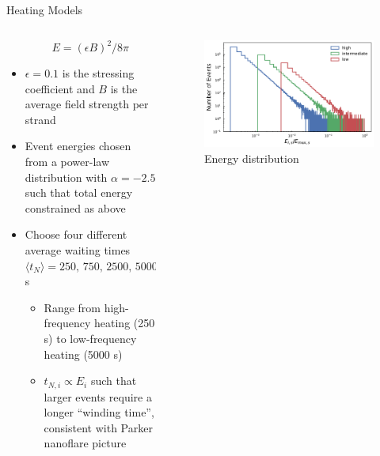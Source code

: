 \documentclass[final]{beamer}
\begin{document}
\begin{frame}
\begin{columns}[T]
\begin{column}{0.49\linewidth}
\begin{block}{Heating Models}
\begin{columns}[T]
\begin{column}{0.49\columnwidth}
\begin{itemize}
            \begin{equation*}
                E = (\epsilon B)^2/8\pi
            \end{equation*}
            \item $\epsilon=0.1$ is the stressing coefficient and $B$ is the average field strength per strand
            \item Event energies chosen from a power-law distribution with $\alpha=-2.5$ such that total energy constrained as above
            \item Choose four different average waiting times $\langle t_N\rangle=250,\,750,\,2500,\,5000$ s 
            \begin{itemize}
            \item Range from high-frequency heating (250 s) to low-frequency heating (5000 s)
            \item $t_{N,i}\propto E_i$ such that larger events require a longer ``winding time'', consistent with Parker nanoflare picture \citep[e.g.][]{cargill_active_2014,barnes_inference_2016-1}
            \end{itemize}
            \end{itemize}
        \end{column}
        \begin{column}{0.49\columnwidth}
            \begin{figure}
                \includegraphics[width=\columnwidth]{figures/heating_rate_distributions.pdf}
                \caption{Energy distribution} 
                \label{fig:wait_times}
            \end{figure}
            \begin{figure}

\end{figure}
\end{column}
\end{columns}
\end{block}
\end{column}
\end{columns}
\end{frame}
\end{document}
